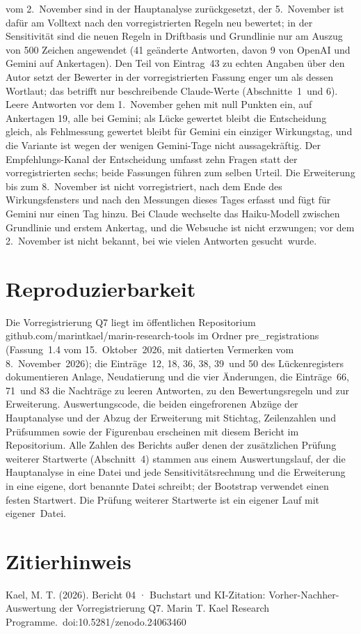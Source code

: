 \documentclass[11pt]{article}
\begin{document}
vom 2.~November sind in der Hauptanalyse zurückgesetzt, der 5.~November ist dafür am Volltext nach den vorregistrierten Regeln neu bewertet; in der Sensitivität sind die neuen Regeln in Driftbasis und Grundlinie nur am Auszug von 500 Zeichen angewendet (41 geänderte Antworten, davon 9 von OpenAI und Gemini auf Ankertagen). Den Teil von Eintrag~43 zu echten Angaben über den Autor setzt der Bewerter in der vorregistrierten Fassung enger um als dessen Wortlaut; das betrifft nur beschreibende Claude-Werte (Abschnitte~1~und 6). Leere Antworten vor dem 1.~November gehen mit null Punkten ein, auf Ankertagen 19, alle bei Gemini; als Lücke gewertet bleibt die Entscheidung gleich, als Fehlmessung gewertet bleibt für Gemini ein einziger Wirkungstag, und die Variante ist wegen der wenigen Gemini-Tage nicht aussagekräftig. Der Empfehlungs-Kanal der Entscheidung umfasst zehn Fragen statt der vorregistrierten sechs; beide Fassungen führen zum selben Urteil. Die Erweiterung bis zum 8.~November ist nicht vorregistriert, nach dem Ende des Wirkungsfensters und nach den Messungen dieses Tages erfasst und fügt für Gemini nur einen Tag hinzu. Bei Claude wechselte das Haiku-Modell zwischen Grundlinie und erstem Ankertag, und die Websuche ist nicht erzwungen; vor dem 2.~November ist nicht bekannt, bei wie vielen Antworten gesucht~\mbox{wurde.}

\let\FBsave\FloatBarrier\let\FloatBarrier\relax{}\section{Reproduzierbarkeit}\let\FloatBarrier\FBsave{}

Die Vorregistrierung Q7 liegt im öffentlichen Repositorium github.com/\allowbreak{}marintkael/\allowbreak{}marin-\allowbreak{}research-\allowbreak{}tools im Ordner pre\_registrations (Fassung~1.4 vom 15.~Oktober~2026, mit datierten Vermerken vom 8.~November~2026); die Einträge~12, 18, 36, 38, 39~und 50 des Lückenregisters dokumentieren Anlage, Neudatierung und die vier Änderungen, die Einträge~66, 71~und 83 die Nachträge zu leeren Antworten, zu den Bewertungsregeln und zur Erweiterung. Auswertungscode, die beiden eingefrorenen Abzüge der Hauptanalyse und der Abzug der Erweiterung mit Stichtag, Zeilenzahlen und Prüfsummen sowie der Figurenbau erscheinen mit diesem Bericht im Repositorium. Alle Zahlen des Berichts außer denen der zusätzlichen Prüfung weiterer Startwerte (Abschnitt~4) stammen aus einem Auswertungslauf, der die Hauptanalyse in eine Datei und jede Sensitivitätsrechnung und die Erweiterung in eine eigene, dort benannte Datei schreibt; der Bootstrap verwendet einen festen Startwert. Die Prüfung weiterer Startwerte ist ein eigener Lauf mit eigener~\mbox{Datei.}

\section{Zitierhinweis}
{\raggedright

Kael, M. T. (2026). Bericht 04 · Buchstart und KI-Zitation: Vorher-Nachher-Auswertung der Vorregistrierung Q7. Marin T. Kael Research Programme.~\mbox{doi:10.5281/zenodo.24063460}
\par}
\end{document}
